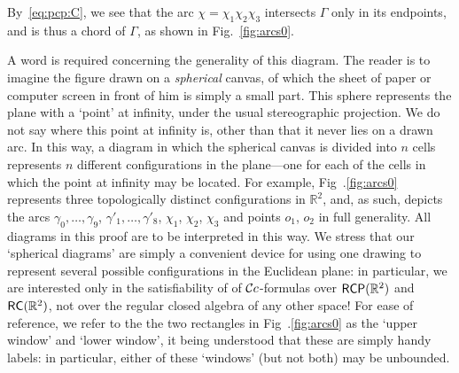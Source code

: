 \documentclass{article}
\newcommand{\R}{\mathbb{R}}
\newcommand{\RC}{{\sf RC}}
\newcommand{\RCP}{{\sf RCP}}
\begin{document}
By~\eqref{eq:pcp:C}, we see that the arc $\chi = \chi_1\chi_2\chi_3$
intersects $\Gamma$ only in its endpoints, and is thus a chord of
$\Gamma$, as shown in Fig.~\ref{fig:arcs0}.

A word is required concerning the generality of this diagram.  The
reader is to imagine the figure drawn on a {\em spherical} canvas, of
which the sheet of paper or computer screen in front of him is simply
a small part.  This sphere represents the plane with a `point' at
infinity, under the usual stereographic projection. We do not say
where this point at infinity is, other than that it never lies on a
drawn arc.  In this way, a diagram in which the spherical canvas is
divided into $n$ cells represents $n$ different configurations in the
plane---one for each of the cells in which the point at infinity may
be located. For example, Fig~.\ref{fig:arcs0} represents three
topologically distinct configurations in $\R^2$, and, as such, depicts
the arcs $\gamma_0, \ldots, \gamma_9$, $\gamma'_1, \ldots, \gamma'_8$,
$\chi_1$, $\chi_2$, $\chi_3$ and points $o_1$, $o_2$ in full
generality.  All diagrams in this proof are to be interpreted in this
way.  We stress that our `spherical diagrams' are simply a convenient
device for using one drawing to represent several possible
configurations in the Euclidean plane: in particular, we are
interested only in the satisfiability of of $\mathcal{C}c$-formulas over
$\RCP(\R^2)$ and $\RC(\R^2)$, not over the regular closed algebra of
any other space!  For ease of reference, we refer to the the two
rectangles in Fig~.\ref{fig:arcs0} as the `upper window' and `lower
window', it being understood that these are simply handy labels: in
particular, either of these `windows' (but not both) may be unbounded.

\bigskip
\end{document}
